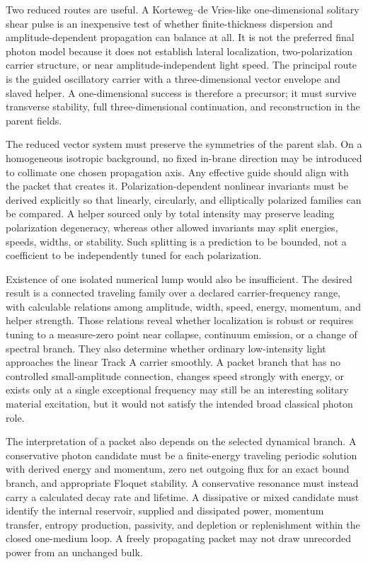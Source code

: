 Two reduced routes are useful. A Korteweg--de Vries-like one-dimensional
solitary shear pulse is an inexpensive test of whether finite-thickness
dispersion and amplitude-dependent propagation can balance at all. It is not
the preferred final photon model because it does not establish lateral
localization, two-polarization carrier structure, or near amplitude-independent
light speed. The principal route is the guided oscillatory carrier with a
three-dimensional vector envelope and slaved helper. A one-dimensional success
is therefore a precursor; it must survive transverse stability, full
three-dimensional continuation, and reconstruction in the parent fields.

The reduced vector system must preserve the symmetries of the parent slab. On a
homogeneous isotropic background, no fixed in-brane direction may be introduced
to collimate one chosen propagation axis. Any effective guide should align with
the packet that creates it. Polarization-dependent nonlinear invariants must be
derived explicitly so that linearly, circularly, and elliptically polarized
families can be compared. A helper sourced only by total intensity may preserve
leading polarization degeneracy, whereas other allowed invariants may split
energies, speeds, widths, or stability. Such splitting is a prediction to be
bounded, not a coefficient to be independently tuned for each polarization.

Existence of one isolated numerical lump would also be insufficient. The desired
result is a connected traveling family over a declared carrier-frequency range,
with calculable relations among amplitude, width, speed, energy, momentum, and
helper strength. Those relations reveal whether localization is robust or
requires tuning to a measure-zero point near collapse, continuum emission, or a
change of spectral branch. They also determine whether ordinary low-intensity
light approaches the linear Track A carrier smoothly. A packet branch that has
no controlled small-amplitude connection, changes speed strongly with energy,
or exists only at a single exceptional frequency may still be an interesting
solitary material excitation, but it would not satisfy the intended broad
classical photon role.

The interpretation of a packet also depends on the selected dynamical branch.
A conservative photon candidate must be a finite-energy traveling periodic
solution with derived energy and momentum, zero net outgoing flux for an exact
bound branch, and appropriate Floquet stability. A conservative resonance must
instead carry a calculated decay rate and lifetime. A dissipative or mixed
candidate must identify the internal reservoir, supplied and dissipated power,
momentum transfer, entropy production, passivity, and depletion or replenishment
within the closed one-medium loop. A freely propagating packet may not draw
unrecorded power from an unchanged bulk.

